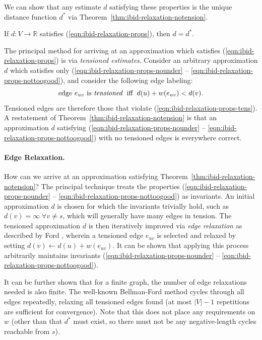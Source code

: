 We can show that any estimate $d$ satisfying these properties
is the unique distance function $d^*$
via Theorem~\ref{thm:ibid-relaxation-notension}.

\begin{theorem}
If $d: V \rightarrow \mathbb{R}$
satisfies (\ref{eqn:ibid-relaxation-props}),
then $d = d^*$.
\label{thm:ibid-relaxation-notension}
\end{theorem}

The principal method for arriving at an approximation
which satisfies (\ref{eqn:ibid-relaxation-props})
is via \emph{tensioned estimates}.
Consider an arbitrary approximation $d$ which satisfies only
(\ref{eqn:ibid-relaxation-props-nounder} --
\ref{eqn:ibid-relaxation-props-nottoogood}),
and consider the following edge labeling:
\begin{equation}
   \mbox{edge } e_{uv} \mbox{ is \emph{tensioned}}
   \;\;\mbox{iff}\;\;
   d(u) + w(e_{uv}) < d(v).
   \label{eqn:ibid-relaxation-tensioned}
\end{equation}
Tensioned edges are therefore those that violate
(\ref{eqn:ibid-relaxation-props-tens}).
A restatement of Theorem~\ref{thm:ibid-relaxation-notension}
is that an approximation $d$
satisfying (\ref{eqn:ibid-relaxation-props-nounder} --
\ref{eqn:ibid-relaxation-props-nottoogood})
with no tensioned edges is everywhere correct.

\paragraph{Edge Relaxation.}
How can we arrive at an approximation
satisfying Theorem~\ref{thm:ibid-relaxation-notension}?
The principal technique treats the properties
(\ref{eqn:ibid-relaxation-props-nounder} --
\ref{eqn:ibid-relaxation-props-nottoogood}) as invariants.
An initial approximation $d$ is chosen for which the invariants
trivially hold,
such as $d(v) = \infty \;\forall v \neq s$,
which will generally have many edges in tension.
The tensioned approximation $d$ is then iteratively improved
via \emph{edge relaxation}
as described by Ford \citep{ford1955networkflowtheory},
wherein a tensioned edge $e_{uv}$ is selected and relaxed
by setting $d(v) \leftarrow d(u) + w(e_{uv})$.
It can be shown that applying this process arbitrarily
maintains invariants
(\ref{eqn:ibid-relaxation-props-nounder} --
\ref{eqn:ibid-relaxation-props-nottoogood}).

It can be further shown that for a finite graph,
the number of edge relaxations needed is also finite.
The well-known Bellman-Ford method
\citep{shimbel1955communicationnets, bellman1958routing,
moore1959spmaze}
cycles through all edges repeatedly,
relaxing all tensioned edges found
(at most $|V|-1$ repetitions are sufficient for convergence).
Note that this does not place any requirements on $w$
(other than that $d^*$ must exist, so there must not be
any negative-length cycles reachable from $s$).

